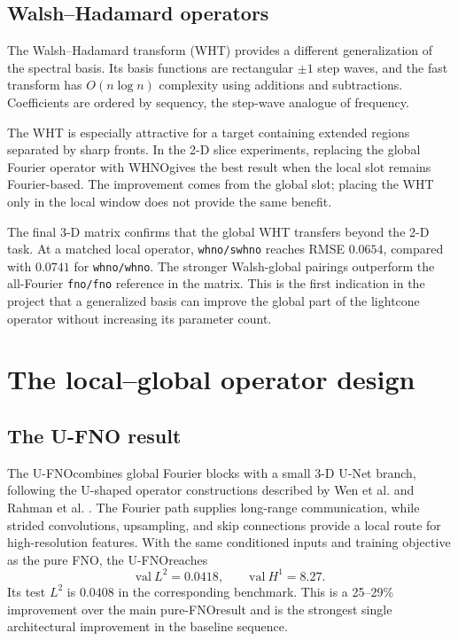 \documentclass[11pt,a4paper]{article}
\newcommand{\Ltwo}{L^2}
\newcommand{\Hone}{H^1}
\newcommand{\FNO}{\textsc{FNO}}
\newcommand{\UFNO}{\textsc{U-FNO}}
\newcommand{\WHNO}{\textsc{WHNO}}
\newcommand{\code}[1]{\texttt{#1}}
\begin{document}
\subsection{Walsh--Hadamard operators}

The Walsh--Hadamard transform (WHT) \cite{perez2025whno} provides a different
generalization of the spectral basis. Its basis functions are rectangular
\(\pm1\) step waves, and
the fast transform has \(O(n\log n)\) complexity using additions and
subtractions. Coefficients are ordered by sequency, the step-wave analogue of
frequency.

The WHT is especially attractive for a target containing extended regions
separated by sharp fronts. In the 2-D slice experiments, replacing the global
Fourier operator with \WHNO gives the best result when the local slot remains
Fourier-based. The improvement comes from the global slot; placing the WHT
only in the local window does not provide the same benefit.

The final 3-D matrix confirms that the global WHT transfers beyond the 2-D
task. At a matched local operator, \code{whno/swhno} reaches RMSE \(0.0654\),
compared with \(0.0741\) for \code{whno/whno}. The stronger Walsh-global
pairings outperform the all-Fourier \code{fno/fno} reference in the matrix.
This is the first indication in the project that a generalized basis can
improve the global part of the lightcone operator without increasing its
parameter count.

\section{The local--global operator design}

\subsection{The U-FNO result}

The \UFNO combines global Fourier blocks with a small 3-D U-Net branch,
following the U-shaped operator constructions described by Wen et al.
\cite{wen2022ufno} and Rahman et al. \cite{rahman2023uno}. The Fourier path
supplies long-range communication,
while strided convolutions,
upsampling, and skip connections provide a local route for high-resolution
features. With the same conditioned inputs and training objective as the pure
\FNO, the \UFNO reaches
\begin{equation}
\boxed{\mathrm{val}\ \Ltwo=0.0418,\qquad
\mathrm{val}\ \Hone=8.27.}
\end{equation}
Its test \(\Ltwo\) is \(0.0408\) in the corresponding benchmark. This is a
25--29\% improvement over the main pure-\FNO result and is the strongest
single architectural improvement in the baseline sequence.
\end{document}
